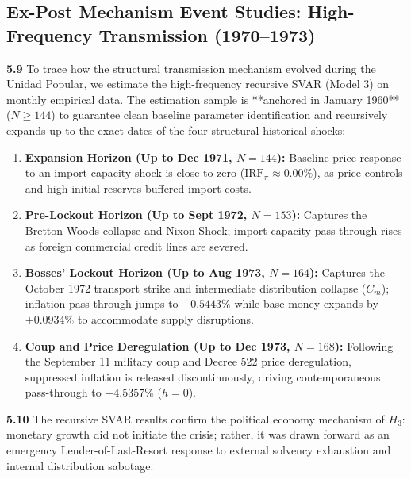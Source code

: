 \subsection{Ex-Post Mechanism Event Studies: High-Frequency Transmission (1970--1973)}
\label{sec:results_event_studies}

\textbf{5.9} To trace how the structural transmission mechanism evolved during the Unidad Popular, we estimate the high-frequency recursive SVAR (Model 3) on monthly empirical data. The estimation sample is **anchored in January 1960** ($N \ge 144$) to guarantee clean baseline parameter identification and recursively expands up to the exact dates of the four structural historical shocks:
\begin{enumerate}[leftmargin=2em]
	\item \textbf{Expansion Horizon (Up to Dec 1971, $N=144$):} Baseline price response to an import capacity shock is close to zero ($\text{IRF}_{\pi} \approx 0.00\%$), as price controls and high initial reserves buffered import costs.
	\item \textbf{Pre-Lockout Horizon (Up to Sept 1972, $N=153$):} Captures the Bretton Woods collapse and Nixon Shock; import capacity pass-through rises as foreign commercial credit lines are severed.
	\item \textbf{Bosses' Lockout Horizon (Up to Aug 1973, $N=164$):} Captures the October 1972 transport strike and intermediate distribution collapse ($C_m$); inflation pass-through jumps to $+0.5443\%$ while base money expands by $+0.0934\%$ to accommodate supply disruptions.
	\item \textbf{Coup and Price Deregulation (Up to Dec 1973, $N=168$):} Following the September 11 military coup and Decree 522 price deregulation, suppressed inflation is released discontinuously, driving contemporaneous pass-through to $+4.5357\%$ ($h=0$).
\end{enumerate}

\textbf{5.10} The recursive SVAR results confirm the political economy mechanism of $H_3$: monetary growth did not initiate the crisis; rather, it was drawn forward as an emergency Lender-of-Last-Resort response to external solvency exhaustion and internal distribution sabotage.

